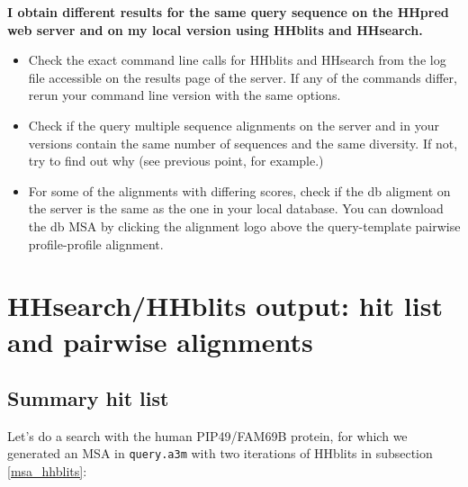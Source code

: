\documentclass[11pt,a4paper]{article}
\begin{document}
{\bf I obtain different results for the same query sequence on the HHpred web server and on my local version using HHblits and HHsearch.}
\begin{itemize}
\item Check the exact command line calls for HHblits and HHsearch from the log file accessible on the results page of the server. If any of the commands differ, rerun your command line version with the same options. 
\item Check if the query multiple sequence alignments on the server and in your versions contain the same number of sequences and the same diversity. If not, try to find out why (see previous point, for example.)
\item For some of the alignments with differing scores, check if the db aligment on the server is the same as the one in your local database. You can download the db MSA by clicking the alignment logo above the query-template pairwise profile-profile alignment.
\end{itemize}


\section{HHsearch/HHblits output: hit list and pairwise alignments}\label{outformat}

\subsection{Summary hit list}

Let's do a search with the human PIP49/FAM69B protein, for which we generated an MSA in \verb`query.a3m` with two iterations of HHblits in subsection \ref{msa_hhblits}:
\end{document}
